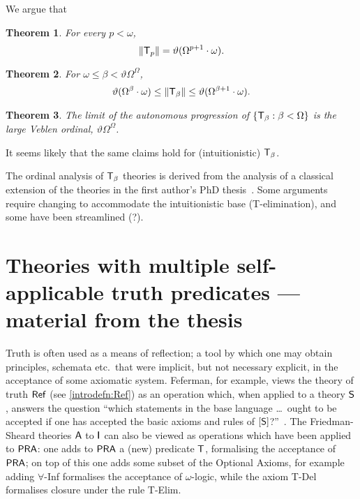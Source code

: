 \documentclass[UKenglish,cleveref,DIV=12]{scrartcl}
\newtheorem{theorem}{Theorem}
\theoremstyle{definition}
\theoremstyle{definition}
\begin{document}
We argue that
%
\begin{theorem}
	For every \( p < \omega \),
\[
  \lVert{\mathsf{T}_p}\rVert = \vartheta ( \Omega ^{p+1} \cdot \omega ).
\]
\end{theorem}

\begin{theorem}
	For \( \omega \le \beta < \vartheta \Omega^\Omega \),
\[
	\vartheta(\Omega^\beta \cdot \omega) \le \lVert{\mathsf{T}_\beta}\rVert \le \vartheta ( \Omega ^{\beta+1} \cdot \omega ).
\]
\end{theorem}

\begin{theorem}
	The limit of the autonomous progression of \( \{ \mathsf{T}_\beta : \beta < \Omega \} \) is the large Veblen ordinal, \( \vartheta \Omega^\Omega \).
\end{theorem}

It seems likely that the same claims hold for (intuitionistic) \( \mathsf{T}_\beta \).

The ordinal analysis of \( \mathsf{T}_\beta \) theories is derived from the analysis of a classical extension of the theories in the first author's PhD thesis~\cite{Lei-thesis}.
Some arguments require changing to accommodate the intuitionistic base (T-elimination), and some have been streamlined (?).

\section{Theories with multiple self-applicable truth predicates --- material from the thesis}
\label{chap:ext}

\fussy Truth is often used as a means of reflection; a tool by which one may obtain
principles, schemata etc.~that were implicit, but not necessary explicit, in the
acceptance of some axiomatic system. Feferman, for example, views the theory
of truth $\mathsf{Ref}$ (see \cref{introdefn:Ref}) as an operation which, when applied
to a theory $\mathsf{S}$, answers the question ``which statements in the base
language \dots{}\ {ought} to be accepted {if} one has accepted the basic axioms and
rules of $[\mathsf{S}]$?''~\cite[p.~2]{Fef91}.
The Friedman-Sheard theories $\mathsf{A}$ to $\mathsf{I}$ can also be viewed as operations which
have been applied to $\mathsf{PRA}$: one adds to $\mathsf{PRA}$ a (new) predicate $\mathsf{T}$,
formalising the acceptance of $\mathsf{PRA}$; on top of this one adds some subset of the Optional
Axioms, for example adding $\forall$-Inf formalises the acceptance of
$\omega$-logic, while the axiom T-Del formalises closure under the rule T-Elim.
\end{document}
